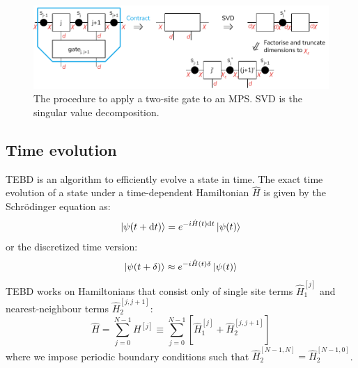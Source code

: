 \documentclass[a4paper, headsepline, footheight=13.6pt]{scrartcl}
\begin{document}
\begin{figure}[htbp]
    \centering
    \includegraphics[width=\textwidth]{figures/two_site_gate.pdf}
    \caption{The procedure to apply a two-site gate to an MPS. SVD is the singular value decomposition.}
    \label{fig:twosite_gate}
\end{figure}

\subsection{Time evolution}
TEBD is an algorithm to efficiently evolve a state in time. The exact time evolution of a state under a time-dependent Hamiltonian $\hat{H}$ is given by the Schrödinger equation as:
\begin{equation}
    \ket{\psi(t+\mathrm{d}t)} = e^{-i\hat{H}(t)\mathrm{d}t}\ket{\psi(t)}
\end{equation}
or the discretized time version:
\begin{equation}
    \ket{\psi(t+\delta)} \approx e^{-i\hat{H}(t)\delta}\ket{\psi(t)}
\end{equation}
TEBD works on Hamiltonians that consist only of single site terms $\hat{H}_1^{[j]}$ and nearest-neighbour terms $\hat{H}_2^{[j, j+1]}$:
\begin{equation}
    \hat{H} = \sum_{j=0}^{N-1} H^{[j]} \equiv \sum_{j=0}^{N-1} \left[\hat{H}_1^{[j]} + \hat{H}_2^{[j, j+1]}\right]
\end{equation}
where we impose periodic boundary conditions such that $\hat{H}_2^{[N-1, N]} = \hat{H}_2^{[N-1, 0]}$.
\end{document}
